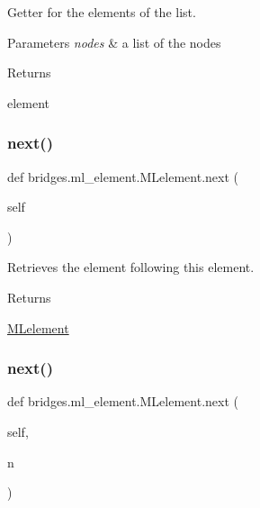 Getter for the elements of the list. 


\begin{DoxyParams}{Parameters}
{\em nodes} & a list of the nodes \\
\hline
\end{DoxyParams}
\begin{DoxyReturn}{Returns}


element 
\end{DoxyReturn}
\mbox{\label{classbridges_1_1ml__element_1_1_m_lelement_a951d30261514e6eaefdd7d60f1c77f73}} 
\subsubsection{\texorpdfstring{next()}{next()}\hspace{0.1cm}{\footnotesize\ttfamily [1/2]}}
{\footnotesize\ttfamily def bridges.\+ml\+\_\+element.\+M\+Lelement.\+next (\begin{DoxyParamCaption}\item[{}]{self }\end{DoxyParamCaption})}



Retrieves the element following this element. 

\begin{DoxyReturn}{Returns}


\hyperlink{classbridges_1_1ml__element_1_1_m_lelement}{M\+Lelement} 
\end{DoxyReturn}
\mbox{\label{classbridges_1_1ml__element_1_1_m_lelement_a588b700bb42eb43ce3993f9715497deb}} 
\subsubsection{\texorpdfstring{next()}{next()}\hspace{0.1cm}{\footnotesize\ttfamily [2/2]}}
{\footnotesize\ttfamily def bridges.\+ml\+\_\+element.\+M\+Lelement.\+next (\begin{DoxyParamCaption}\item[{}]{self,  }\item[{}]{n }\end{DoxyParamCaption})}

